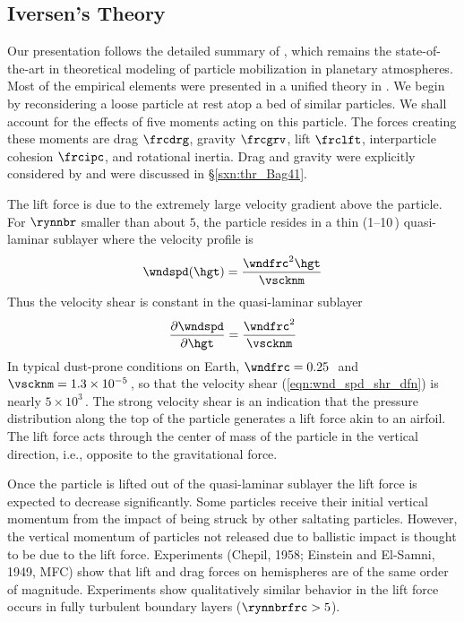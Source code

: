 \documentclass[12pt,twoside]{book}
\begin{document}
\subsection[Iversen's Theory]{Iversen's Theory}\label{sxn:thr_GrI85}
Our presentation follows the detailed summary of \cite{GrI85}, which
remains the state-of-the-art in theoretical modeling of particle
mobilization in planetary atmospheres.  
Most of the empirical elements were presented in a unified theory in
\cite{IvW82}. 
We begin by reconsidering a loose particle at rest atop a bed of
similar particles.
We shall account for the effects of five moments acting on this
particle.  
The forces creating these moments are drag $\frcdrg$, gravity
$\frcgrv$, lift $\frclft$, interparticle cohesion $\frcipc$, and
rotational inertia.
Drag and gravity were explicitly considered by \cite{Bag41} and were
discussed in \S\ref{sxn:thr_Bag41}. 

The lift force is due to the extremely large velocity gradient above 
the particle. 
For $\rynnbr$ smaller than about $5$, the particle resides in a thin
(1--10\,\mm) quasi-laminar sublayer where the velocity profile is 
\begin{equation}
\wndspd(\hgt) = \frac{\wndfrc^{2} \hgt}{\vscknm}
\label{eqn:wnd_spd_lmn_dfn}
\end{equation}
Thus the velocity shear is constant in the quasi-laminar sublayer 
\begin{equation}
\frac{\partial \wndspd}{\partial \hgt} = \frac{\wndfrc^{2}}{\vscknm}
\label{eqn:wnd_spd_shr_dfn}
\end{equation}
In typical dust-prone conditions on Earth, $\wndfrc = 0.25$\,\mxs\ and 
$\vscknm = 1.3 \times 10^{-5}$\,\mSxs, so that the velocity shear
(\ref{eqn:wnd_spd_shr_dfn}) is nearly $5 \times 10^{3}$\,\mxsm.
The strong velocity shear is an indication that the pressure
distribution along the top of the particle generates a lift force akin 
to an airfoil.
The lift force acts through the center of mass of the particle in the
vertical direction, i.e., opposite to the gravitational force.

Once the particle is lifted out of the quasi-laminar sublayer the lift
force is expected to decrease significantly.
Some particles receive their initial vertical momentum from the impact
of being struck by other saltating particles.
However, the vertical momentum of particles not released due to
ballistic impact is thought to be due to the lift force.
Experiments (Chepil, 1958; Einstein and El-Samni, 1949, MFC) show
that lift and drag forces on hemispheres are of the same order of
magnitude.  
Experiments show qualitatively similar behavior in the lift force
occurs in fully turbulent boundary layers ($\rynnbrfrc > 5$).
\end{document}
